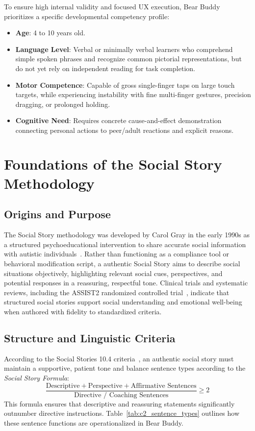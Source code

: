 To ensure high internal validity and focused UX execution, Bear Buddy prioritizes a specific developmental competency profile:
\begin{itemize}
    \item \textbf{Age}: 4 to 10 years old.
    \item \textbf{Language Level}: Verbal or minimally verbal learners who comprehend simple spoken phrases and recognize common pictorial representations, but do not yet rely on independent reading for task completion.
    \item \textbf{Motor Competence}: Capable of gross single-finger taps on large touch targets, while experiencing instability with fine multi-finger gestures, precision dragging, or prolonged holding.
    \item \textbf{Cognitive Need}: Requires concrete cause-and-effect demonstration connecting personal actions to peer/adult reactions and explicit reasons.
\end{itemize}

\section{Foundations of the Social Story Methodology}

\subsection{Origins and Purpose}

The Social Story methodology was developed by Carol Gray in the early 1990s as a structured psychoeducational intervention to share accurate social information with autistic individuals~\cite{gray_overview, gray_what_is}. Rather than functioning as a compliance tool or behavioral modification script, a authentic Social Story aims to describe social situations objectively, highlighting relevant social cues, perspectives, and potential responses in a reassuring, respectful tone. Clinical trials and systematic reviews, including the ASSIST2 randomized controlled trial~\cite{wright_assist2_2024}, indicate that structured social stories support social understanding and emotional well-being when authored with fidelity to standardized criteria.

\subsection{Structure and Linguistic Criteria}

According to the Social Stories 10.4 criteria~\cite{gray_criteria_2023}, an authentic social story must maintain a supportive, patient tone and balance sentence types according to the \textit{Social Story Formula}:
\begin{equation}
\frac{\text{Descriptive} + \text{Perspective} + \text{Affirmative Sentences}}{\text{Directive / Coaching Sentences}} \ge 2
\end{equation}
This formula ensures that descriptive and reassuring statements significantly outnumber directive instructions. Table~\ref{tab:c2_sentence_types} outlines how these sentence functions are operationalized in Bear Buddy.

